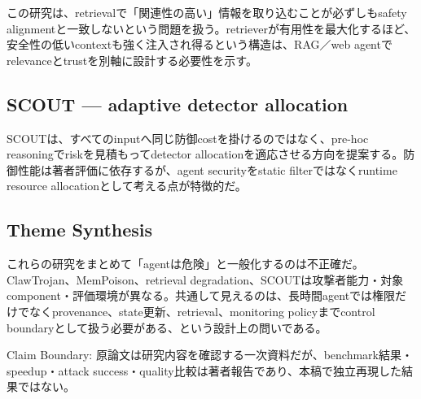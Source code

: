 この研究は、retrievalで「関連性の高い」情報を取り込むことが必ずしもsafety alignmentと一致しないという問題を扱う。retrieverが有用性を最大化するほど、安全性の低いcontextも強く注入され得るという構造は、RAG／web agentでrelevanceとtrustを別軸に設計する必要性を示す。\autocite{src-062c2718dd96}


\subsection{SCOUT — adaptive detector allocation}

SCOUTは、すべてのinputへ同じ防御costを掛けるのではなく、pre-hoc reasoningでriskを見積もってdetector allocationを適応させる方向を提案する。防御性能は著者評価に依存するが、agent securityをstatic filterではなくruntime resource allocationとして考える点が特徴的だ。\autocite{src-b818bca6d4b6}


\subsection{Theme Synthesis}

これらの研究をまとめて「agentは危険」と一般化するのは不正確だ。ClawTrojan、MemPoison、retrieval degradation、SCOUTは攻撃者能力・対象component・評価環境が異なる。共通して見えるのは、長時間agentでは権限だけでなくprovenance、state更新、retrieval、monitoring policyまでcontrol boundaryとして扱う必要がある、という設計上の問いである。\autocite{src-062c2718dd96,src-7fa0ea6bcf47,src-b818bca6d4b6,src-f216d6cd7707}


\begin{claimboundary}
Claim Boundary: 原論文は研究内容を確認する一次資料だが、benchmark結果・speedup・attack success・quality比較は著者報告であり、本稿で独立再現した結果ではない。\autocite{src-062c2718dd96,src-7fa0ea6bcf47,src-b818bca6d4b6,src-f216d6cd7707}
\end{claimboundary}
